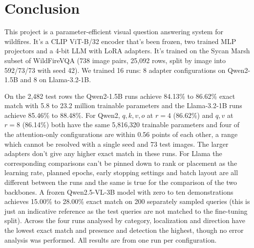 \documentclass[12pt]{report}
\begin{document}
\section{Conclusion}
This project is a parameter-efficient visual question answering system for wildfires. It's a CLIP ViT-B/32 encoder that's been frozen, two trained MLP projectors and a 4-bit LLM with LoRA adapters. It's trained on the Sycan Marsh subset of WildFireVQA (738 image pairs, 25,092 rows, split by image into 592/73/73 with seed 42). We trained 16 runs: 8 adapter configurations on Qwen2-1.5B and 8 on Llama-3.2-1B.

On the 2,482 test rows the Qwen2-1.5B runs achieve 84.13\% to 86.62\% exact match with 5.8 to 23.2 million trainable parameters and the Llama-3.2-1B runs achieve 85.46\% to 88.48\%. For Qwen2, $q,k,v,o$ at $r=4$ (86.62\%) and $q,v$ at $r=8$ (86.14\%) both have the same 5,816,320 trainable parameters and four of the attention-only configurations are within 0.56 points of each other, a range which cannot be resolved with a single seed and 73 test images. The larger adapters don't give any higher exact match in these runs. For Llama the corresponding comparisons can't be pinned down to rank or placement as the learning rate, planned epochs, early stopping settings and batch layout are all different between the runs and the same is true for the comparison of the two backbones. A frozen Qwen2.5-VL-3B model with zero to ten demonstrations achieves 15.00\% to 28.00\% exact match on 200 separately sampled queries (this is just an indicative reference as the test queries are not matched to the fine-tuning split). Across the four runs analysed by category, localization and direction have the lowest exact match and presence and detection the highest, though no error analysis was performed. All results are from one run per configuration.
\end{document}
